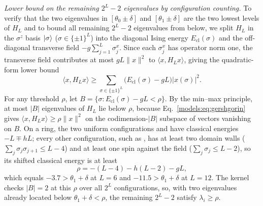 \emph{Lower bound on the remaining $2^L-2$ eigenvalues by configuration counting.}
To verify that the two eigenvalues in $[\theta_0\pm\delta]$ and
$[\theta_1\pm\delta]$ are the two lowest levels of $H_L$ and to bound
all remaining $2^L-2$ eigenvalues from below, we split $H_L$ in the
$\sigma^z$ basis $|\sigma\rangle$ ($\sigma\in\{\pm1\}^L$) into the
diagonal Ising energy $E_{\mathrm{cl}}(\sigma)$ and the off-diagonal
transverse field $-g\sum_{j=1}^L\sigma_j^x$. Since each $\sigma_j^x$ has
operator norm one, the transverse field contributes at most $gL\|x\|^2$
to $\langle x,H_Lx\rangle$, giving the quadratic-form lower bound
\begin{equation}
    \langle x,H_Lx\rangle
    \ge\sum_{\sigma\in\{\pm1\}^L}\bigl(E_{\mathrm{cl}}(\sigma)-gL\bigr)|x(\sigma)|^2.
    \label{models:eq:gershgorin}
\end{equation}
For any threshold $\rho$, let
$B=\{\sigma:E_{\mathrm{cl}}(\sigma)-gL<\rho\}$. By the min--max
principle, at most $|B|$ eigenvalues of $H_L$ lie below $\rho$, because
Eq.~\eqref{models:eq:gershgorin} gives $\langle x,H_Lx\rangle\ge\rho\|x\|^2$
on the codimension-$|B|$ subspace of vectors vanishing on $B$. On a
ring, the two uniform configurations  and
 have classical energies $-L\mp hL$; every
other configuration, such as , has at least two
domain walls ($\sum_j\sigma_j\sigma_{j+1}\le L-4$) and at least one spin
against the field ($\sum_j\sigma_j\le L-2$), so its shifted classical
energy is at least
\begin{equation}
    \rho=-(L-4)-h(L-2)-gL,
    \label{models:eq:ising-rho}
\end{equation}
which equals $-3.7>\theta_1+\delta$ at $L=6$ and $-11.5>\theta_1+\delta$
at $L=12$. The kernel checks $|B|=2$ at this $\rho$ over all $2^L$
configurations, so, with two eigenvalues already located below
$\theta_1+\delta<\rho$, the remaining $2^L-2$ satisfy $\lambda_i\ge\rho$.

